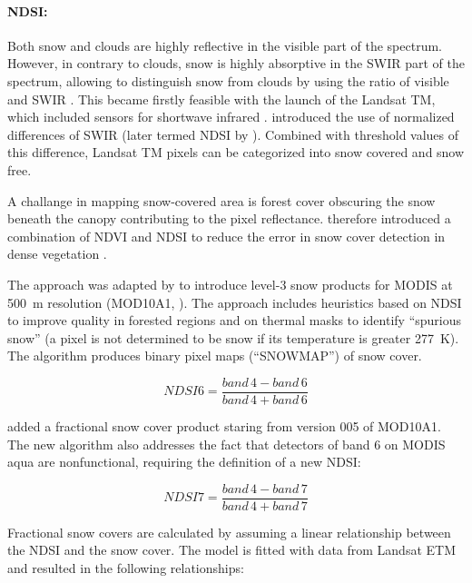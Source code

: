 \documentclass[letterpaper, parskip=half]{scrartcl}
\begin{document}
\paragraph{\gls{NDSI}:}
Both snow and clouds are highly reflective in the visible part of the spectrum. However, in contrary to clouds, snow is highly absorptive in the \gls{SWIR} part of the spectrum, allowing to distinguish snow from clouds by using the ratio of visible and \gls{SWIR} \citep{Hall2011}. This became firstly feasible with the launch of the Landsat \gls{TM}, which included sensors for shortwave infrared \citep{Lettenmaier2015}. \cite{Dozier1989} introduced the use of normalized differences of \gls{SWIR} (later termed \gls{NDSI} by \cite{Hall1995}). Combined with threshold values of this difference, Landsat TM pixels can be categorized into snow covered and snow free.

A challange in mapping snow-covered area is forest cover obscuring the snow beneath the canopy contributing to the pixel reflectance. \cite{Klein1998} therefore introduced a combination of \gls{NDVI} and \gls{NDSI} to reduce the error in snow cover detection in dense vegetation \cite{Nolin2010}.
 
The approach was adapted by \cite{Hall2002, Hall2001} to introduce level-3 snow products for \gls{MODIS} at \SI{500}{\meter} resolution (MOD10A1, \citep{Hall2016}). The approach includes heuristics based on \gls{NDSI} to improve quality in forested regions and on thermal masks to identify ``spurious snow'' (a pixel is not determined to be snow if its temperature is greater \SI{277}{\kelvin}). The algorithm produces binary pixel maps (``SNOWMAP'') of snow cover.


\begin{equation}
 NDSI6 = \frac{band \, 4 -band \, 6}{band \, 4 + band \, 6}
\end{equation}

\cite{Salomonson2006, Salomonson2004} added a fractional snow cover product staring from version 005 of MOD10A1. The new algorithm also addresses the fact that detectors of band 6 on \gls{MODIS} aqua are nonfunctional, requiring the definition of a new \gls{NDSI}:

\begin{equation}
 NDSI7 = \frac{band \, 4 -band \, 7}{band \, 4 + band \, 7}
\end{equation}

Fractional snow covers are calculated by assuming a linear relationship between the \gls{NDSI} and the snow cover. The model is fitted with data from Landsat \gls{ETM} and resulted in the following relationships:
\end{document}
